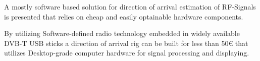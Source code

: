 A mostly software based solution for direction of arrival
estimation of RF-Signals is presented that relies on
cheap and easily optainable hardware components.

By utilizing Software-defined radio technology embedded
in widely available DVB-T USB sticks a direction of arrival
rig can be built for less than 50€ that utilizes Desktop-grade
computer hardware for signal processing and displaying.
